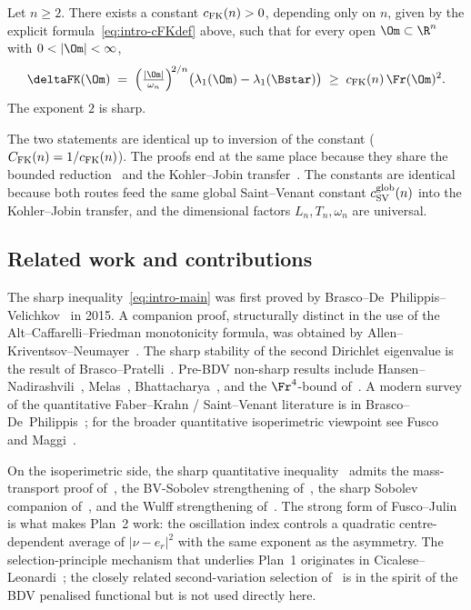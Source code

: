 \begin{theorem}
\label{thm:plan2-FK-intro}
Let $n\ge 2$. There exists a constant $c_{\rm FK}(n)>0$, depending
only on $n$, given by the explicit formula~\eqref{eq:intro-cFKdef}
above, such that for every open $\Om\subset\R^n$ with $0<|\Om|<\infty$,
\begin{equation}\label{eq:intro-plan2-FK}
   \deltaFK(\Om)
   \;=\;
   \Bigl(\tfrac{|\Om|}{\omega_n}\Bigr)^{\!2/n}
   \bigl(\lambda_1(\Om)-\lambda_1(\Bstar)\bigr)
   \;\ge\;c_{\rm FK}(n)\,\Fr(\Om)^2.
\end{equation}
The exponent $2$ is sharp.
\end{theorem}

The two statements are identical up to inversion of the constant
($C_{\rm FK}(n)=1/c_{\rm FK}(n)$). The proofs end at the same place
because they share the bounded reduction~\cite[Lem.~5.3]{BDV} and the
Kohler--Jobin transfer~\cite[Thm~3.3]{Brasco2014}. The constants are
identical because both routes feed the same global Saint--Venant
constant $c_{\rm SV}^{\rm glob}(n)$ into the Kohler--Jobin transfer,
and the dimensional factors $L_n,T_n,\omega_n$ are universal.

\subsection{Related work and contributions}
\label{ssec:intro-related}

The sharp inequality~\eqref{eq:intro-main} was first
proved by Brasco--De~Philippis--Velichkov~\cite{BDV} in 2015. A
companion proof, structurally distinct in the use of the
Alt--Caffarelli--Friedman monotonicity formula, was obtained by
Allen--Kriventsov--Neumayer~\cite{AKN2023}. The sharp stability of the
second Dirichlet eigenvalue is the result of
Brasco--Pratelli~\cite{BrascoPratelli2012}. Pre-BDV non-sharp results
include Hansen--Nadirashvili~\cite{HansenNadirashvili1994},
Melas~\cite{Melas1992}, Bhattacharya~\cite{Bhattacharya2001}, and the
$\Fr^4$-bound of~\cite{FMPLaplace}. A modern survey of the quantitative
Faber--Krahn / Saint--Venant literature is in
Brasco--De~Philippis~\cite{BraDeP2017}; for the broader quantitative
isoperimetric viewpoint see Fusco~\cite{FuscoSurvey} and
Maggi~\cite{Maggi2008}.

On the isoperimetric side, the sharp quantitative
inequality~\cite{FMP2008} admits the mass-transport
proof of~\cite{FMP2010}, the BV-Sobolev strengthening of~\cite{FMP_BV},
the sharp Sobolev companion of~\cite{CFMP2009}, and the Wulff
strengthening of~\cite{NeumayerWulff}. The strong form of
Fusco--Julin~\cite{FJ2014} is what makes Plan~2 work: the oscillation
index controls a quadratic centre-dependent average of $|\nu-e_r|^2$
with the same exponent as the asymmetry. The selection-principle
mechanism that underlies Plan~1 originates in
Cicalese--Leonardi~\cite{CL2012}; the closely related second-variation
selection of~\cite{AFM2013} is in the spirit of the BDV penalised
functional but is not used directly here.

